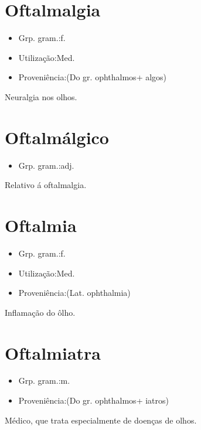\section{Oftalmalgia}
\begin{itemize}
\item {Grp. gram.:f.}
\end{itemize}
\begin{itemize}
\item {Utilização:Med.}
\end{itemize}
\begin{itemize}
\item {Proveniência:(Do gr. \textunderscore ophthalmos\textunderscore  + \textunderscore algos\textunderscore )}
\end{itemize}
Neuralgia nos olhos.
\section{Oftalmálgico}
\begin{itemize}
\item {Grp. gram.:adj.}
\end{itemize}
Relativo á oftalmalgia.
\section{Oftalmia}
\begin{itemize}
\item {Grp. gram.:f.}
\end{itemize}
\begin{itemize}
\item {Utilização:Med.}
\end{itemize}
\begin{itemize}
\item {Proveniência:(Lat. \textunderscore ophthalmia\textunderscore )}
\end{itemize}
Inflamação do ôlho.
\section{Oftalmiatra}
\begin{itemize}
\item {Grp. gram.:m.}
\end{itemize}
\begin{itemize}
\item {Proveniência:(Do gr. \textunderscore ophthalmos\textunderscore  + \textunderscore iatros\textunderscore )}
\end{itemize}
Médico, que trata especialmente de doenças de olhos.
